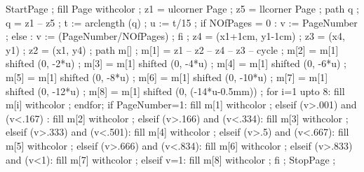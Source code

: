StartPage ;
fill Page withcolor  ;
z1 = ulcorner Page ;
z5 = llcorner Page ;
path q ;
q = z1 -- z5 ;
t := arclength (q) ;
u := t/15 ;
if NOfPages = 0 :
  v := PageNumber ;
else :
  v := (PageNumber/NOfPages) ;
fi ;
z4 = (x1+1cm, y1-1cm) ;
z3 = (x4, y1) ;
z2 = (x1, y4) ;
path m[] ;
m[1] = z1 -- z2 -- z4 -- z3 -- cycle ;
m[2] = m[1] shifted (0, -2*u) ;
m[3] = m[1] shifted (0, -4*u) ;
m[4] = m[1] shifted (0, -6*u) ;
m[5] = m[1] shifted (0, -8*u) ;
m[6] = m[1] shifted (0, -10*u) ;
m[7] = m[1] shifted (0, -12*u) ;
m[8] = m[1] shifted (0, (-14*u-0.5mm)) ;
for i=1 upto 8:
	fill m[i] withcolor ;
endfor;
if PageNumber=1:
	fill m[1] withcolor  ;
elseif (v>.001) and (v<.167) :
	fill m[2] withcolor  ;	
elseif (v>.166) and (v<.334):
	fill m[3] withcolor  ;	
elseif (v>.333) and (v<.501):
	fill m[4] withcolor  ;	
elseif (v>.5) and (v<.667):
	fill m[5] withcolor  ;	
elseif (v>.666) and (v<.834):
	fill m[6] withcolor  ;	
elseif (v>.833) and (v<1):
	fill m[7] withcolor  ;	
elseif v=1:
	fill m[8] withcolor  ;
fi ;
StopPage ;
\stopuseMPgraphic 







\setupTitle[\c!headcolor={simpleslides:contrastcolor}]


\setupSlideTitle
   [\c!after=,
    \c!alternative=layer,
    \c!width=\textwidth,
    \c!align=\v!center,
    \c!height=2.5cm,
    \c!color=simpleslides:contrastcolor]


\setupTitle
  [\c!title\c!color={simpleslides:contrastcolor},
   \c!author\c!color={simpleslides:contrastcolor},
   \c!date\c!color={simpleslides:contrastcolor}]

\setupcombinations[distance=0cm]


\setupitemize[1][inmargin][color=simpleslides:itemize:color]

\protect
\stopmodule

\endinput

